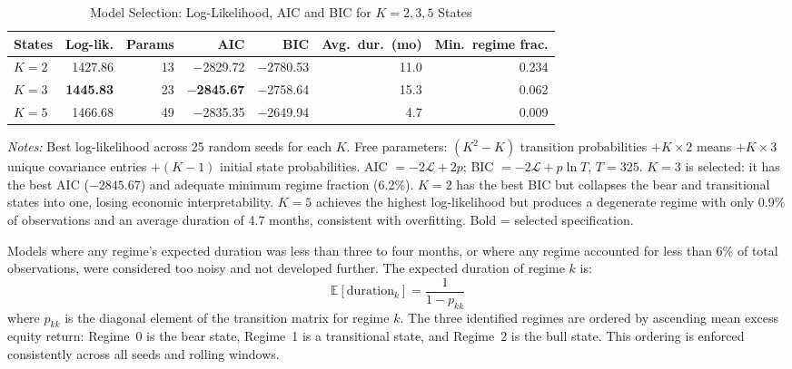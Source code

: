 \documentclass[12pt, a4paper]{article}
\begin{document}
\begin{table}[htbp]
\centering
\caption{Model Selection: Log-Likelihood, AIC and BIC for $K = 2, 3, 5$ States}
\label{tab:model_selection}
\setlength{\tabcolsep}{8pt}
\small
\begin{tabular}{lrrrrrr}
\toprule
\textbf{States} & \textbf{Log-lik.} & \textbf{Params} & \textbf{AIC} & \textbf{BIC}
  & \textbf{Avg.\ dur.\ (mo)} & \textbf{Min.\ regime frac.} \\
\midrule
$K = 2$ & 1427.86 & 13 & $-$2829.72 & $-$2780.53 & 11.0 & 0.234 \\
$K = 3$ & \textbf{1445.83} & 23 & $\mathbf{-}$\textbf{2845.67} & $-$2758.64 & 15.3 & 0.062 \\
$K = 5$ & 1466.68 & 49 & $-$2835.35 & $-$2649.94 & 4.7 & 0.009 \\
\bottomrule
\end{tabular}
\begin{minipage}{\linewidth}
\vspace{4pt}\footnotesize
\textit{Notes:} Best log-likelihood across 25 random seeds for each $K$. Free parameters:
$(K^2-K)$ transition probabilities $+ K\times 2$ means $+ K\times 3$ unique covariance entries $+ (K-1)$
initial state probabilities. AIC $= -2\mathcal{L} + 2p$; BIC $= -2\mathcal{L} + p\ln T$, $T=325$.
$K=3$ is selected: it has the best AIC ($-2845.67$) and adequate minimum regime fraction (6.2\%). $K=2$ has the best BIC but collapses the bear and transitional states into one, losing economic interpretability. $K=5$ achieves the highest log-likelihood but produces a degenerate regime with only 0.9\% of observations and an average duration of 4.7 months, consistent with overfitting. Bold = selected specification.
\end{minipage}
\end{table}


Models where any regime's expected duration was less than three to four months, or where any
regime accounted for less than 6\% of total observations, were considered too noisy and not
developed further. The expected duration of regime $k$ is:
\begin{equation}
  \mathbb{E}[\text{duration}_k] = \frac{1}{1 - p_{kk}}
  \label{eq:duration}
\end{equation}
where $p_{kk}$ is the diagonal element of the transition matrix for regime $k$. The three
identified regimes are ordered by ascending mean excess equity return: Regime~0 is the bear
state, Regime~1 is a transitional state, and Regime~2 is the bull state. This ordering is
enforced consistently across all seeds and rolling windows.
\end{document}
